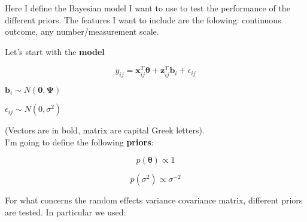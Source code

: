 \documentclass[a4paper]{article}
\begin{document}
Here I define the Bayesian model I want to use to test the performance of the different priors. The features I want to include are the folowing: continuous outcome, any number/measurement scale.

Let's start with the \textbf{model}

\begin{equation}
	y_{ij} = \bm{x}^{T}_{ij} \bm{\theta} + \bm{z}^{T}_{ij}\bm{b}_i + \epsilon_{ij}
\end{equation}

$ \bm{b}_i \sim N(\bm{0}, \bm{\Psi}) $

$ \epsilon_{ij} \sim N(0, \sigma^2) $

\vspace{5mm}

(Vectors are in bold, matrix are capital Greek letters).\\
I'm going to define the following \textbf{priors}:

\vspace{5mm}

\begin{equation}
p(\bm{\theta}) \propto 1
\end{equation}

\begin{equation}
p(\sigma^2) \propto \sigma^{-2}
\end{equation}

For what concerns the random effects variance covariance matrix, different priors are tested. In particular we used:
\end{document}
